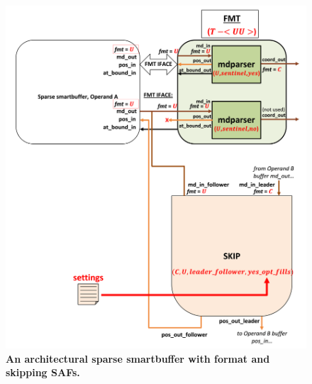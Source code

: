 \begin{figure}[H]
\includegraphics[width=\textwidth]{figures/safinference_build_10skipoptfillscust.png}
\caption{\textbf{An architectural sparse smartbuffer with format and skipping SAFs.}}
\label{fig:safinference_build_10skipoptfillscust}
\centering
\end{figure}



